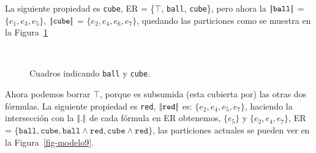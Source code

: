 La siguiente propiedad es \texttt{cube}, ER = \{$\top$, \texttt{ball}, \texttt{cube}\}, pero ahora la $|\!|\texttt{ball}|\!|$ = $\{e_1,e_3,e_5\}$, 
$|\!|\texttt{cube}|\!|$ = $\{e_2, e_4, e_6, e_7\}$, quedando las particiones como se muestra en la Figura~\ref{fig-modelo4}

%

\begin{figure}[ht]
\begin{center}
\\[0pt]
\caption{Cuadros indicando \texttt{ball} y \texttt{cube}.}
\label{fig-modelo4}
\end{center}
\end{figure}
Ahora podemos borrar $\top$, porque es subsumida (esta cubierta por) las otras dos f\'ormulas. La siguiente propiedad es \texttt{red}, 
$|\!|\texttt{red}|\!|$ es: $\{e_2, e_4, e_5, e_7\}$, haciendo la intersecci\'on con la $|\!|.|\!|$ de cada f\'ormula en ER obtenemos, 
$\{e_5\}$ y $\{e_2, e_4, e_7\}$, ER = $\{\texttt{ball}, \texttt{cube}, \texttt{ball} \wedge \texttt{red}, \texttt{cube} \wedge \texttt{red}\}$, 
las particiones actuales se pueden ver en la Figura~\ref{fig-modelo9}.

%

